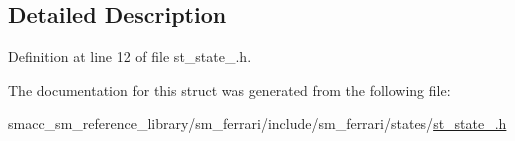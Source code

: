 \subsection{Detailed Description}


Definition at line 12 of file st\+\_\+state\+\_.\+h.



The documentation for this struct was generated from the following file\+:\begin{DoxyCompactItemize}
\item 
smacc\+\_\+sm\+\_\+reference\+\_\+library/sm\+\_\+ferrari/include/sm\+\_\+ferrari/states/\hyperlink{sm__ferrari_2include_2sm__ferrari_2states_2st__state__2_8h}{st\+\_\+state\+\_.\+h}\end{DoxyCompactItemize}
